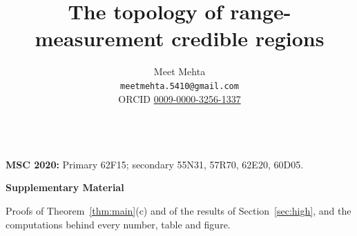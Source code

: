 \documentclass[11pt]{article}
\title{\sffamily\bfseries The topology of range-measurement credible regions}
\author{Meet Mehta\\[2pt] \small\texttt{meetmehta.5410@gmail.com}\\ \small ORCID \href{https://orcid.org/0009-0000-3256-1337}{0009-0000-3256-1337}}
\date{}
\theoremstyle{sfplain}
\theoremstyle{sfremark}
\begin{document}
\maketitle

\begin{abstract}\noindent

\end{abstract}

\\[2pt]
{\sffamily\small\textbf{MSC 2020:} Primary 62F15; secondary 55N31, 57R70, 62E20, 60D05.}






\appendix


\clearpage
\setcounter{section}{0}
\renewcommand{\thesection}{S\arabic{section}}
\begin{center}{\sffamily\large\bfseries Supplementary Material}\end{center}
\noindent Proofs of Theorem~\ref{thm:main}(c) and of the results of Section~\ref{sec:high}, and the computations
behind every number, table and figure.


\end{document}
